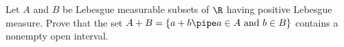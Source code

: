 Let $A$ and $B$ be Lebesgue measurable subsets of $\R$ having positive
Lebesgue measure. Prove that the set $A+B=\{a+b\pipe a\in A \text{\
and\ } b\in B\}$ contains a nonempty open interval.
